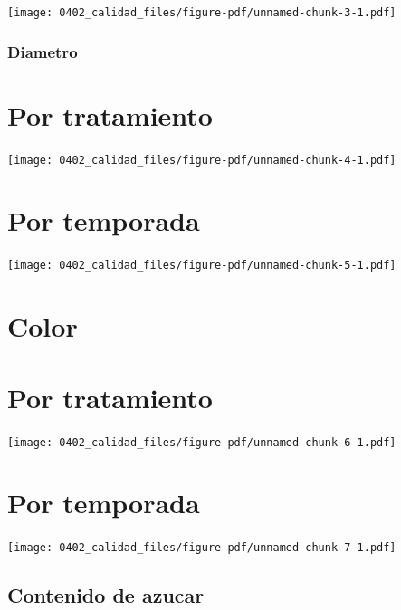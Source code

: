 \documentclass[
  letterpaper,
  DIV=11,
  numbers=noendperiod]{scrreprt}
\begin{document}
\begin{center}
\texttt{[image: 0402\_calidad\_files/figure-pdf/unnamed-chunk-3-1.pdf]}
\end{center}

\subsection{Diametro}\label{diametro-1}

\chapter{Por tratamiento}

\begin{center}
\texttt{[image: 0402\_calidad\_files/figure-pdf/unnamed-chunk-4-1.pdf]}
\end{center}

\chapter{Por temporada}

\begin{center}
\texttt{[image: 0402\_calidad\_files/figure-pdf/unnamed-chunk-5-1.pdf]}
\end{center}

\chapter{Color}\label{color-1}

\chapter{Por tratamiento}

\begin{center}
\texttt{[image: 0402\_calidad\_files/figure-pdf/unnamed-chunk-6-1.pdf]}
\end{center}

\chapter{Por temporada}

\begin{center}
\texttt{[image: 0402\_calidad\_files/figure-pdf/unnamed-chunk-7-1.pdf]}
\end{center}

\section{Contenido de azucar}\label{contenido-de-azucar-1}
\end{document}
